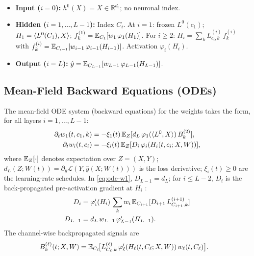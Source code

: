 \documentclass[nohyperref]{article}
\theoremstyle{plain}
\theoremstyle{definition}
\theoremstyle{remark}
\begin{document}
\begin{itemize}
\item \textbf{Input ($i=0$):} $h^0(X)=X \in \mathbb{R}^{d_0}$; no neuronal index.
\item \textbf{Hidden ($i=1,\ldots,L-1$):} Index $C_i$. At $i=1$: frozen $L^0(c_1)$; $H_1=\langle L^0(C_1), X \rangle$; $f_k^{(1)}=\mathbb{E}_{C_1}[w_1\,\varphi_1(H_1)]$. For $i\ge 2$: $H_i=\sum_k L^{(i)}_{c_i,k}\,f_k^{(i)}$ with $f_k^{(i)}=\mathbb{E}_{C_{i-1}}[w_{i-1}\,\varphi_{i-1}(H_{i-1})]$. Activation $\varphi_i(H_i)$.
\item \textbf{Output ($i=L$):} $\hat{y}=\mathbb{E}_{C_{L-1}}[w_{L-1}\,\varphi_{L-1}(H_{L-1})]$.
\end{itemize}
\subsection{Mean-Field Backward Equations (ODEs)}
\label{sec:derivation}

The mean-field ODE system (backward equations) for the weights takes the form, for all layers $i=1,\ldots,L-1$:
\begin{equation}
\begin{split}
\partial_t w_1(t,c_1,k) &= -\xi_1(t)\,\mathbb{E}_Z[d_L\,\varphi_1(\langle L^0, X \rangle)\,B_k^{(2)}], \\
\partial_t w_i(t,c_i) &= -\xi_i(t)\,\mathbb{E}_Z[D_i\,\varphi_i(H_i(t,c_i;X,W))],
\end{split}
\label{eq:ode-w1}
\end{equation}
where $\mathbb{E}_Z[\cdot]$ denotes expectation over $Z=(X,Y)$; $d_L(Z;W(t)) = \partial_{\hat{y}} \mathscr{L}(Y, \hat{y}(X;W(t)))$ is the loss derivative; $\xi_i(t) \ge 0$ are the learning-rate schedules. In \eqref{eq:ode-w1}, $D_{L-1}=d_L$; for $i \le L-2$, $D_i$ is the back-propagated pre-activation gradient at $H_i$ \cite{nguyen2023rigorousframeworkmeanfield}:
\begin{equation}
\label{eq:Di-recursion}
\begin{split}
D_i &= \varphi_i'(H_i)\,\sum_k w_i\,\mathbb{E}_{C_{i+1}}[ D_{i+1}\,L^{(i+1)}_{C_{i+1},k} ]\\
D_{L-1} &= d_L\,w_{L-1}\,\varphi_{L-1}'(H_{L-1}).
\end{split}
\end{equation}
The channel-wise backpropagated signals are
\begin{align*}
B_k^{(\ell)}(t;X,W) &= \mathbb{E}_{C_\ell}\!\big[L^{(\ell)}_{C_\ell,k}\,\varphi_\ell'(H_\ell(t,C_\ell;X,W))\,w_\ell(t,C_\ell)\big].
\end{align*}
\end{document}
